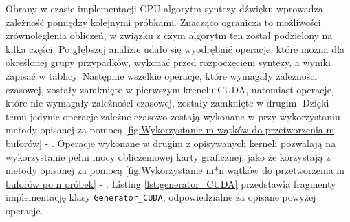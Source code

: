 \vspace{10pt}Obrany w czasie implementacji CPU algorytm syntezy dźwięku wprowadza zależność pomiędzy kolejnymi próbkami. Znacząco ogranicza to możliwości zrównoleglenia obliczeń, w związku z czym algorytm ten został podzielony na kilka części. Po głębszej analizie udało się wyodrębnić operacje, które można dla określonej grupy przypadków, wykonać przed rozpoczęciem syntezy, a wyniki zapisać w tablicy. Następnie wszelkie operacje, które wymagały zależności czasowej, zostały zamknięte w pierwszym krenelu CUDA, natomiast operacje, które nie wymagały zależności czasowej, zostały zamknięte w drugim. Dzięki temu jedynie operacje zależne czasowo zostają wykonane w przy wykorzystaniu metody opisanej za pomocą \ref{fig:Wykorzystanie m wątków do przetworzenia m buforów} - . Operacje wykonane w drugim z opisywanych kerneli pozwalają na wykorzystanie pełni mocy obliczeniowej karty graficznej, jako że korzystają z metody opisanej za pomocą \ref{fig:Wykorzystanie m*n wątków do przetworzenia m buforów po n próbek} - . Listing \ref{lst:generator_CUDA} przedstawia fragmenty implementację klasy \texttt{Generator\_CUDA}, odpowiedzialne za opisane powyżej operacje. 

